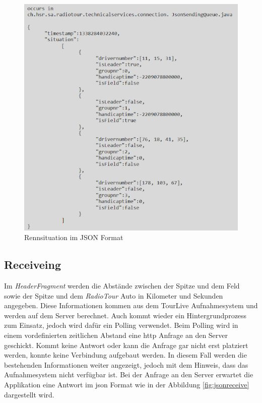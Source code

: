 \begin{figure}[H]
\caption{Rennsituation im JSON Format}
\label{fig:jsonsend}
\centering
\includegraphics[scale=1]{05bericht/images/json.png}
\end{figure}


\subsection{Receiveing}
Im \textit{HeaderFragment} werden die Abstände zwischen der Spitze und dem Feld sowie der Spitze und dem \textit{RadioTour} Auto in Kilometer und Sekunden angegeben. Diese Informationen kommen aus dem TourLive Aufnahmesystem und werden auf dem Server berechnet. Auch kommt wieder ein Hintergrundprozess zum Einsatz, jedoch wird dafür ein Polling verwendet. Beim Polling wird in einem vordefinierten zeitlichen Abstand eine \gls{http} Anfrage an den Server geschickt. Kommt keine Antwort oder kann die Anfrage gar nicht erst platziert werden, konnte keine Verbindung aufgebaut werden. In diesem Fall werden die bestehenden Informationen weiter angezeigt, jedoch mit dem Hinweis, dass das Aufnahmesystem nicht verfügbar ist. Bei der Anfrage an den Server erwartet die Applikation eine Antwort im \gls{json} Format wie in der Abbildung \ref{fig:jsonreceive} dargestellt wird.

